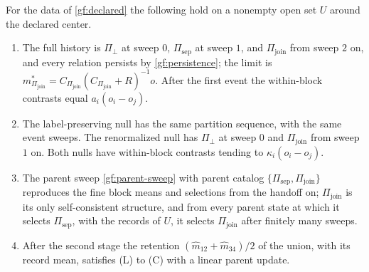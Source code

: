 For the data of \cref{gf:declared} the following hold on a nonempty open set
$U$ around the declared center.
\begin{enumerate}
\item[(i)] The full history is $\Pi_\perp$ at sweep $0$, $\Pi_{\mathrm{sep}}$
at sweep $1$, and $\Pi_{\mathrm{join}}$ from sweep $2$ on, and every
relation persists by \cref{gf:persistence}; the limit is
$m^*_{\Pi_{\mathrm{join}}}=C_{\Pi_{\mathrm{join}}}(C_{\Pi_{\mathrm{join}}}+R)^{-1}o$.
After the first event the within-block contrasts equal $a_i(o_i-o_j)$.
\item[(ii)] The label-preserving null has the same partition sequence, with
the same event sweeps. The renormalized null has $\Pi_\perp$ at sweep $0$ and
$\Pi_{\mathrm{join}}$ from sweep $1$ on. Both nulls have within-block
contrasts tending to $\kappa_i(o_i-o_j)$.
\item[(iii)] The parent sweep \cref{gf:parent-sweep} with parent catalog
$\{\Pi_{\mathrm{sep}},\Pi_{\mathrm{join}}\}$ reproduces the fine block means
and selections from the handoff on; $\Pi_{\mathrm{join}}$ is its only
self-consistent structure, and from every parent state at which it selects
$\Pi_{\mathrm{sep}}$, with the records of $U$, it selects $\Pi_{\mathrm{join}}$
after finitely many sweeps.
\item[(iv)] After the second stage the retention
$(\hat m_{12}+\hat m_{34})/2$ of the union, with its record mean, satisfies
(L) to (C) with a linear parent update.
\end{enumerate}
